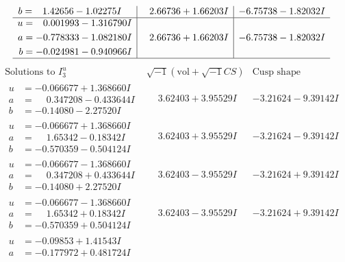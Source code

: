 \documentclass[1p]{elsarticle_modified}
\theoremstyle{definition}
\newcommand{\I}{\sqrt{-1}}
\begin{document}
$$\begin{array}{c|c|c}
\begin{aligned}
b &= \phantom{-}1.42656 - 1.02275 I\end{aligned}
 & \phantom{-}2.66736 + 1.66203 I & -6.75738 - 1.82032 I \\ \hline\begin{aligned}
u &= \phantom{-}0.001993 - 1.316790 I \\
a &= -0.778333 - 1.082180 I \\
b &= -0.024981 - 0.940966 I\end{aligned}
 & \phantom{-}2.66736 + 1.66203 I & -6.75738 - 1.82032 I\\
 \hline 
 \end{array}$$\newpage$$\begin{array}{c|c|c}  
\text{Solutions to }I^u_{3}& \I (\text{vol} + \sqrt{-1}CS) & \text{Cusp shape}\\
 \hline 
\begin{aligned}
u &= -0.066677 + 1.368660 I \\
a &= \phantom{-}0.347208 - 0.433644 I \\
b &= -0.14080 - 2.27520 I\end{aligned}
 & \phantom{-}3.62403 + 3.95529 I & -3.21624 - 9.39142 I \\ \hline\begin{aligned}
u &= -0.066677 + 1.368660 I \\
a &= \phantom{-}1.65342 - 0.18342 I \\
b &= -0.570359 - 0.504124 I\end{aligned}
 & \phantom{-}3.62403 + 3.95529 I & -3.21624 - 9.39142 I \\ \hline\begin{aligned}
u &= -0.066677 - 1.368660 I \\
a &= \phantom{-}0.347208 + 0.433644 I \\
b &= -0.14080 + 2.27520 I\end{aligned}
 & \phantom{-}3.62403 - 3.95529 I & -3.21624 + 9.39142 I \\ \hline\begin{aligned}
u &= -0.066677 - 1.368660 I \\
a &= \phantom{-}1.65342 + 0.18342 I \\
b &= -0.570359 + 0.504124 I\end{aligned}
 & \phantom{-}3.62403 - 3.95529 I & -3.21624 + 9.39142 I \\ \hline\begin{aligned}
u &= -0.09853 + 1.41543 I \\
a &= -0.177972 + 0.481724 I \\

\end{aligned}
\end{array}$$
\end{document}
